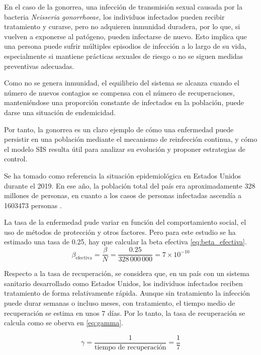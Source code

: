 En el caso de la gonorrea, una infección de transmisión sexual causada por la bacteria \textit{Neisseria gonorrhoeae}, los individuos infectados pueden recibir tratamiento y curarse, pero no adquieren inmunidad duradera, por lo que, si vuelven a exponerse al patógeno, pueden infectarse de nuevo. Esto implica que una persona puede sufrir múltiples episodios de infección a lo largo de su vida, especialmente si mantiene prácticas sexuales de riesgo o no se siguen medidas preventivas adecuadas.

Como no se genera inmunidad, el equilibrio del sistema se alcanza cuando el número de nuevos contagios se compensa con el número de recuperaciones, manteniéndose una proporción constante de infectados en la población, puede darse una situación de endemicidad.

Por tanto, la gonorrea es un claro ejemplo de cómo una enfermedad puede persistir en una población mediante el mecanismo de reinfección continua, y cómo el modelo SIS resulta útil para analizar su evolución y proponer estrategias de control.

Se ha tomado como referencia la situación epidemiológica en Estados Unidos durante el 2019. En ese año, la población total del país era aproximadamente 328 millones de personas, en cuanto a los casos de personas infectadas ascendía a 1603473 personas \cite{pollock2023estimated}.

La tasa de la enfermedad pude variar en función del comportamiento social, el uso de métodos de protección y otros factores. Pero para este estudio se ha estimado una tasa de 0.25, hay que calcular la beta efectiva \eqref{eq:beta_efectiva}.
\begin{equation}
\beta_{\text{efectiva}} = \frac{\beta}{N} = \frac{0.25}{328\,000\,000} = 7 \times 10^{-10}
\label{eq:beta_efectiva}
\end{equation}



Respecto a la tasa de recuperación, se considera que, en un país con un sistema sanitario desarrollado como Estados Unidos, los individuos infectados reciben tratamiento de forma relativamente rápida. Aunque sin tratamiento la infección puede durar semanas o incluso meses, con tratamiento, el tiempo medio de recuperación se estima en unos 7 días. Por lo tanto, la tasa de recuperación se calcula como se oberva en \eqref{eq:gamma}.

\begin{equation}
\gamma = \frac{1}{\text{tiempo de recuperación}} = \frac{1}{7}
\label{eq:gamma}
\end{equation}

